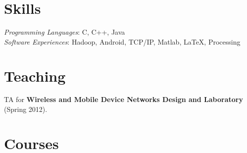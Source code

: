 \documentclass[margin,line]{resume}
\begin{document}
\begin{resume}
    \newpage
      
 \section{\mysidestyle Skills} 

    \textsl{Programming Languages}: C, C++, Java\\
    \textsl{Software Experiences}: Hadoop, Android, TCP/IP, Matlab, \LaTeX, Processing\\



\section{\mysidestyle Teaching}
TA for \textbf{Wireless and Mobile Device Networks Design and Laboratory} (Spring 2012).

\section{\mysidestyle Courses} 


\end{resume}
\end{document}
